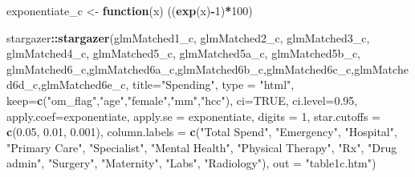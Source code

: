 \documentclass[]{article}
\newenvironment{Shaded}{\begin{snugshade}}{\end{snugshade}}
\newcommand{\KeywordTok}[1]{\textcolor[rgb]{0.13,0.29,0.53}{\textbf{#1}}}
\newcommand{\DataTypeTok}[1]{\textcolor[rgb]{0.13,0.29,0.53}{#1}}
\newcommand{\DecValTok}[1]{\textcolor[rgb]{0.00,0.00,0.81}{#1}}
\newcommand{\FloatTok}[1]{\textcolor[rgb]{0.00,0.00,0.81}{#1}}
\newcommand{\StringTok}[1]{\textcolor[rgb]{0.31,0.60,0.02}{#1}}
\newcommand{\OtherTok}[1]{\textcolor[rgb]{0.56,0.35,0.01}{#1}}
\newcommand{\ControlFlowTok}[1]{\textcolor[rgb]{0.13,0.29,0.53}{\textbf{#1}}}
\newcommand{\OperatorTok}[1]{\textcolor[rgb]{0.81,0.36,0.00}{\textbf{#1}}}
\newcommand{\NormalTok}[1]{#1}
\begin{document}
\begin{Shaded}
\begin{Highlighting}[]
\NormalTok{exponentiate_c <-}\StringTok{ }\ControlFlowTok{function}\NormalTok{(x) ((}\KeywordTok{exp}\NormalTok{(x)}\OperatorTok{-}\DecValTok{1}\NormalTok{)}\OperatorTok{*}\DecValTok{100}\NormalTok{)}

\NormalTok{stargazer}\OperatorTok{::}\KeywordTok{stargazer}\NormalTok{(glmMatched1_c, glmMatched2_c, glmMatched3_c, glmMatched4_c, glmMatched5_c, glmMatched5a_c, glmMatched5b_c, glmMatched6_c,glmMatched6a_c,glmMatched6b_c,glmMatched6c_c,glmMatched6d_c,glmMatched6e_c,}
                     \DataTypeTok{title=}\StringTok{"Spending"}\NormalTok{, }
                     \DataTypeTok{type =} \StringTok{"html"}\NormalTok{,}
                     \DataTypeTok{keep=}\KeywordTok{c}\NormalTok{(}\StringTok{"om_flag"}\NormalTok{,}\StringTok{"age"}\NormalTok{,}\StringTok{"female"}\NormalTok{,}\StringTok{"mm"}\NormalTok{,}\StringTok{"hcc"}\NormalTok{),}
                     \DataTypeTok{ci=}\OtherTok{TRUE}\NormalTok{, }\DataTypeTok{ci.level=}\FloatTok{0.95}\NormalTok{,}
                     \DataTypeTok{apply.coef=}\NormalTok{exponentiate, }\DataTypeTok{apply.se =}\NormalTok{ exponentiate,}
                     \DataTypeTok{digits =} \DecValTok{1}\NormalTok{, }
                     \DataTypeTok{star.cutoffs =} \KeywordTok{c}\NormalTok{(}\FloatTok{0.05}\NormalTok{, }\FloatTok{0.01}\NormalTok{, }\FloatTok{0.001}\NormalTok{),}
                     \DataTypeTok{column.labels =} \KeywordTok{c}\NormalTok{(}\StringTok{"Total Spend"}\NormalTok{, }\StringTok{"Emergency"}\NormalTok{, }\StringTok{"Hospital"}\NormalTok{, }\StringTok{"Primary Care"}\NormalTok{, }\StringTok{"Specialist"}\NormalTok{, }\StringTok{"Mental Health"}\NormalTok{, }\StringTok{"Physical Therapy"}\NormalTok{, }\StringTok{"Rx"}\NormalTok{, }\StringTok{"Drug admin"}\NormalTok{, }\StringTok{"Surgery"}\NormalTok{, }\StringTok{"Maternity"}\NormalTok{, }\StringTok{"Labs"}\NormalTok{, }\StringTok{"Radiology"}\NormalTok{),}
                     \DataTypeTok{out =} \StringTok{"table1c.htm"}\NormalTok{)}
\end{Highlighting}
\end{Shaded}
\end{document}
